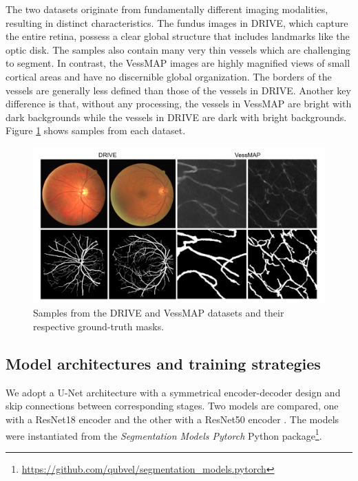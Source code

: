 \documentclass[%
reprint,
nofootinbib,
 amsmath,amssymb,
aps,
superscriptaddress,
showkeys,
longbibliography
]{revtex4-1}
\begin{document}
The two datasets originate from fundamentally different imaging modalities, resulting in distinct characteristics. The fundus images in DRIVE, which capture the entire retina, possess a clear global structure that includes landmarks like the optic disk. The samples also contain many very thin vessels which are challenging to segment. In contrast, the VessMAP images are highly magnified views of small cortical areas and have no discernible global organization. The borders of the vessels are generally less defined than those of the vessels in DRIVE. Another key difference is that, without any processing, the vessels in VessMAP are bright with dark backgrounds while the vessels in DRIVE are dark with bright backgrounds. Figure \ref{f:drive_vessmap_samples} shows samples from each dataset.

\begin{figure}[tbp]
    \centering
    \includegraphics[width=\columnwidth]{figures/results/drive_vessmap_samples.pdf}
    \caption{Samples from the DRIVE and VessMAP datasets and their respective ground-truth masks.}
    \label{f:drive_vessmap_samples}
\end{figure}

\subsection{Model architectures and training strategies}

We adopt a U-Net architecture with a symmetrical encoder-decoder design and skip connections between corresponding stages. Two models are compared, one with a ResNet18 encoder and the other with a ResNet50 encoder \cite{he2016deep}. The models were instantiated from the \textit{Segmentation Models Pytorch} Python package\footnote{\url{https://github.com/qubvel/segmentation_models.pytorch}}.
\end{document}

